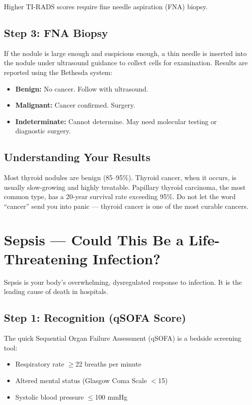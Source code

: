 Higher TI-RADS scores require fine needle aspiration (FNA) biopsy.

\subsection{Step 3: FNA Biopsy}

If the nodule is large enough and suspicious enough, a thin needle is inserted into the nodule under ultrasound guidance to collect cells for examination. Results are reported using the Bethesda system:
\begin{itemize}
    \item \textbf{Benign:} No cancer. Follow with ultrasound.
    \item \textbf{Malignant:} Cancer confirmed. Surgery.
    \item \textbf{Indeterminate:} Cannot determine. May need molecular testing or diagnostic surgery.
\end{itemize}

\subsection{Understanding Your Results}

Most thyroid nodules are benign (85--95\%). Thyroid cancer, when it occurs, is usually slow-growing and highly treatable. Papillary thyroid carcinoma, the most common type, has a 20-year survival rate exceeding 95\%. Do not let the word ``cancer'' send you into panic --- thyroid cancer is one of the most curable cancers.

\clearpage
\section{Sepsis --- Could This Be a Life-Threatening Infection?}

Sepsis is your body's overwhelming, dysregulated response to infection. It is the leading cause of death in hospitals.

\subsection{Step 1: Recognition (qSOFA Score)}

The quick Sequential Organ Failure Assessment (qSOFA) is a bedside screening tool:
\begin{itemize}
    \item Respiratory rate $\geq$22 breaths per minute
    \item Altered mental status (Glasgow Coma Scale $<$15)
    \item Systolic blood pressure $\leq$100 mmHg
\end{itemize}

